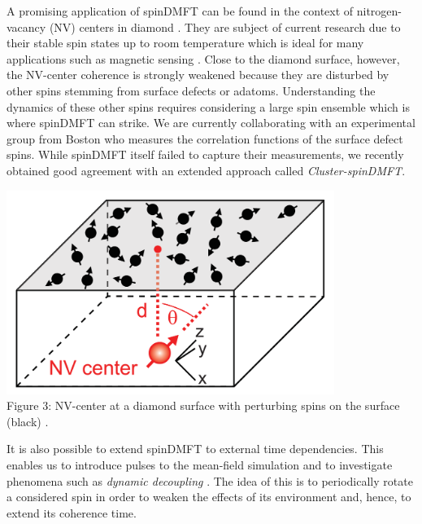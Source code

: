 \documentclass[20pt]{article}
\newcommand{\mcaption}[2]{ \\ Figure {#1}: {#2} } %
\begin{document}
\begin{minipage}{0.65\textwidth}
    A promising application of spinDMFT can be found in the context of nitrogen-vacancy (NV) centers in diamond \cite{jelez06}. They are subject of current research due 
    to their stable spin states up to room temperature which is ideal for many applications such as magnetic sensing \cite{sushk14}. Close to the diamond surface, however, 
    the NV-center coherence is strongly weakened because they are disturbed by other spins stemming from surface defects or adatoms. Understanding 
    the dynamics of these other spins requires considering a large spin ensemble which is where spinDMFT can strike. We are currently collaborating with an experimental 
    group from Boston who measures the correlation functions of the surface defect spins. While spinDMFT itself failed 
    to capture their measurements, we recently obtained good agreement with an extended approach called \emph{Cluster-spinDMFT}.
\end{minipage}
\hspace{0.01\textwidth}
\begin{minipage}{0.35\textwidth}
    \begin{center}
        \includegraphics[width=0.8\textwidth]{images/NV_ensemble.png}
        \mcaption{3}{NV-center at a diamond surface with perturbing spins on the surface (black) \cite{rossk14}.}
    \end{center}     
\end{minipage}
\vspace{1.3mm}

It is also possible to extend spinDMFT to external time dependencies. This enables us to introduce pulses to the mean-field simulation and to investigate phenomena such as 
\emph{dynamic decoupling} \cite{uhrig07}. The idea of this is to periodically rotate a considered spin in order to weaken the effects of its environment and, 
hence, to extend its coherence time.
\end{document}
